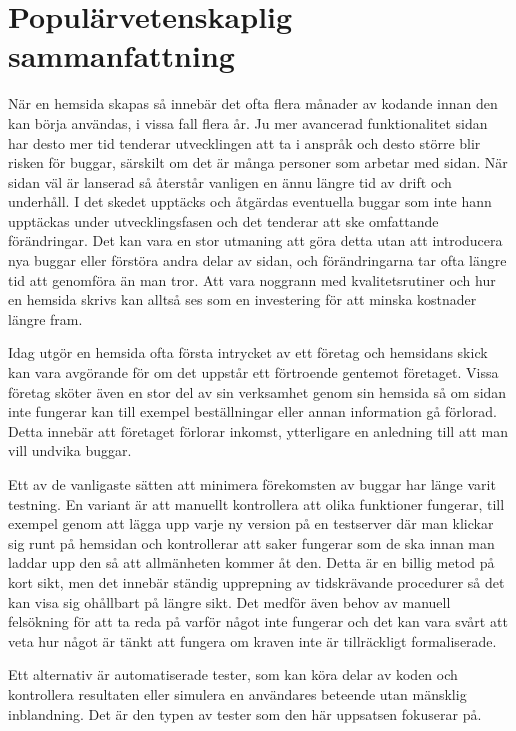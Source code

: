 \newpage
\null
\newpage

\section*{Populärvetenskaplig sammanfattning}

När en hemsida skapas så innebär det ofta flera månader av kodande innan den kan börja användas, i vissa fall flera år. Ju mer avancerad funktionalitet sidan har desto mer tid tenderar utvecklingen att ta i anspråk och desto större blir risken för buggar, särskilt om det är många personer som arbetar med sidan. När sidan väl är lanserad så återstår vanligen en ännu längre tid av drift och underhåll. I det skedet upptäcks och åtgärdas eventuella buggar som inte hann upptäckas under utvecklingsfasen och det tenderar att ske omfattande förändringar. Det kan vara en stor utmaning att göra detta utan att introducera nya buggar eller förstöra andra delar av sidan, och förändringarna tar ofta längre tid att genomföra än man tror. Att vara noggrann med kvalitetsrutiner och hur en hemsida skrivs kan alltså ses som en investering för att minska kostnader längre fram.

Idag utgör en hemsida ofta första intrycket av ett företag och hemsidans skick kan vara avgörande för om det uppstår ett förtroende gentemot företaget. Vissa företag sköter även en stor del av sin verksamhet genom sin hemsida så om sidan inte fungerar kan till exempel beställningar eller annan information gå förlorad. Detta innebär att företaget förlorar inkomst, ytterligare en anledning till att man vill undvika buggar.

Ett av de vanligaste sätten att minimera förekomsten av buggar har länge varit testning. En variant är att manuellt kontrollera att olika funktioner fungerar, till exempel genom att lägga upp varje ny version på en testserver där man klickar sig runt på hemsidan och kontrollerar att saker fungerar som de ska innan man laddar upp den så att allmänheten kommer åt den. Detta är en billig metod på kort sikt, men det innebär ständig upprepning av tidskrävande procedurer så det kan visa sig ohållbart på längre sikt. Det medför även behov av manuell felsökning för att ta reda på varför något inte fungerar och det kan vara svårt att veta hur något är tänkt att fungera om kraven inte är tillräckligt formaliserade.

Ett alternativ är automatiserade tester, som kan köra delar av koden och kontrollera resultaten eller simulera en användares beteende utan mänsklig inblandning. Det är den typen av tester som den här uppsatsen fokuserar på.

